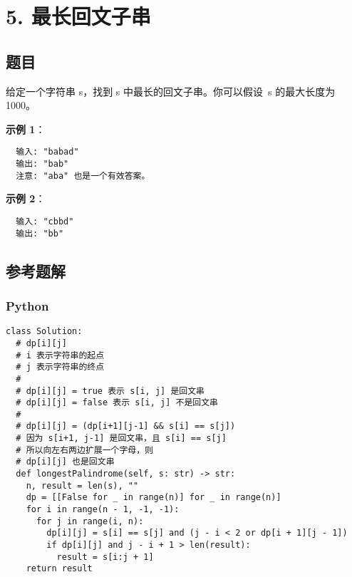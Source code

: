 \newpage
\section{5. 最长回文子串}
\label{leetcode:5}

\subsection{题目}

给定一个字符串 s，找到 s 中最长的回文子串。你可以假设 s 的最大长度为 1000。

\textbf{示例 1}：

\begin{verbatim}
  输入: "babad"
  输出: "bab"
  注意: "aba" 也是一个有效答案。
\end{verbatim}

\textbf{示例 2}：

\begin{verbatim}
  输入: "cbbd"
  输出: "bb"
\end{verbatim}

\subsection{参考题解}

\subsubsection{Python}

\begin{verbatim}
class Solution:
  # dp[i][j]
  # i 表示字符串的起点
  # j 表示字符串的终点
  #
  # dp[i][j] = true 表示 s[i, j] 是回文串
  # dp[i][j] = false 表示 s[i, j] 不是回文串
  #
  # dp[i][j] = (dp[i+1][j-1] && s[i] == s[j])
  # 因为 s[i+1, j-1] 是回文串，且 s[i] == s[j]
  # 所以向左右两边扩展一个字母，则
  # dp[i][j] 也是回文串
  def longestPalindrome(self, s: str) -> str:
    n, result = len(s), ""
    dp = [[False for _ in range(n)] for _ in range(n)]
    for i in range(n - 1, -1, -1):
      for j in range(i, n):
        dp[i][j] = s[i] == s[j] and (j - i < 2 or dp[i + 1][j - 1])
        if dp[i][j] and j - i + 1 > len(result):
          result = s[i:j + 1]
    return result
\end{verbatim}

